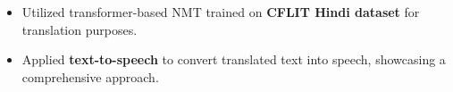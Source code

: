 \documentclass[a4paper,10.5pt]{article}
\begin{document}
\begin{itemize}
\begin{itemize}[noitemsep,nolistsep]
    \item  Utilized transformer-based NMT trained on \textbf{CFLIT Hindi dataset} for translation purposes.
    \vspace{0.07cm}
    
    \item Applied \textbf{text-to-speech} to convert translated text into speech, showcasing a comprehensive approach.
\end{itemize}
\vspace{0.15cm}

    



\end{itemize}
\end{document}
